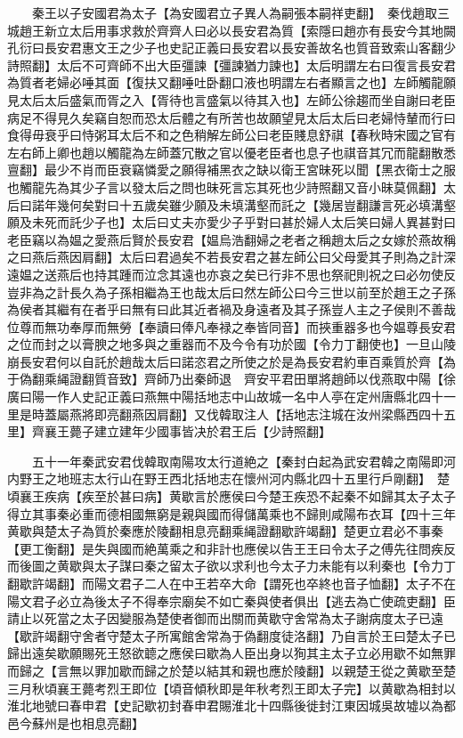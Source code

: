 　　秦王以子安國君為太子【為安國君立子異人為嗣張本嗣祥吏翻】　秦伐趙取三城趙王新立太后用事求救於齊齊人曰必以長安君為質【索隱曰趙亦有長安今其地闕孔衍曰長安君惠文王之少子也史記正義曰長安君以長安善故名也質音致索山客翻少詩照翻】太后不可齊師不出大臣彊諫【彊諫猶力諫也】太后明謂左右曰復言長安君為質者老婦必唾其面【復扶又翻唾吐卧翻口液也明謂左右者顯言之也】左師觸龍願見太后太后盛氣而胥之入【胥待也言盛氣以待其入也】左師公徐趨而坐自謝曰老臣病足不得見久矣竊自恕而恐太后體之有所苦也故願望見太后太后曰老婦恃輦而行曰食得毋衰乎曰恃粥耳太后不和之色稍解左師公曰老臣賤息舒祺【春秋時宋國之官有左右師上卿也趙以觸龍為左師蓋冗散之官以優老臣者也息子也祺音其冗而龍翻散悉亶翻】最少不肖而臣衰竊憐愛之願得補黑衣之缺以衛王宮昧死以聞【黑衣衛士之服也觸龍先為其少子言以發太后之問也昧死言忘其死也少詩照翻又音小昧莫佩翻】太后曰諾年幾何矣對曰十五歲矣雖少願及未填溝壑而託之【幾居豈翻謙言死必填溝壑願及未死而託少子也】太后曰丈夫亦愛少子乎對曰甚於婦人太后笑曰婦人異甚對曰老臣竊以為媪之愛燕后賢於長安君【媪烏浩翻婦之老者之稱趙太后之女嫁於燕故稱之曰燕后燕因肩翻】太后曰君過矣不若長安君之甚左師公曰父母愛其子則為之計深遠媪之送燕后也持其踵而泣念其遠也亦哀之矣已行非不思也祭祀則祝之曰必勿使反豈非為之計長久為子孫相繼為王也哉太后曰然左師公曰今三世以前至於趙王之子孫為侯者其繼有在者乎曰無有曰此其近者禍及身遠者及其子孫豈人主之子侯則不善哉位尊而無功奉厚而無勞【奉讀曰俸凡奉禄之奉皆同音】而挾重器多也今媪尊長安君之位而封之以膏腴之地多與之重器而不及今令有功於國【令力丁翻使也】一旦山陵崩長安君何以自託於趙哉太后曰諾恣君之所使之於是為長安君約車百乘質於齊【為于偽翻乘䋲證翻質音致】齊師乃出秦師退　齊安平君田單將趙師以伐燕取中陽【徐廣曰陽一作人史記正義曰燕無中陽括地志中山故城一名中人亭在定州唐縣北四十一里是時蓋屬燕將即亮翻燕因肩翻】又伐韓取注人【括地志注城在汝州梁縣西四十五里】齊襄王薨子建立建年少國事皆决於君王后【少詩照翻】

　　五十一年秦武安君伐韓取南陽攻太行道絶之【秦封白起為武安君韓之南陽即河内野王之地班志太行山在野王西北括地志在懷州河内縣北四十五里行戶剛翻】　楚頃襄王疾病【疾至於甚曰病】黄歇言於應侯曰今楚王疾恐不起秦不如歸其太子太子得立其事秦必重而德相國無窮是親與國而得儲萬乘也不歸則咸陽布衣耳【四十三年黄歇與楚太子為質於秦應於陵翻相息亮翻乘䋲證翻歇許竭翻】楚更立君必不事秦【更工衡翻】是失與國而絶萬乘之和非計也應侯以告王王曰令太子之傅先往問疾反而後圖之黄歇與太子謀曰秦之留太子欲以求利也今太子力未能有以利秦也【令力丁翻歇許竭翻】而陽文君子二人在中王若卒大命【謂死也卒終也音子恤翻】太子不在陽文君子必立為後太子不得奉宗廟矣不如亡秦與使者俱出【逃去為亡使疏吏翻】臣請止以死當之太子因變服為楚使者御而出關而黄歇守舍常為太子謝病度太子已遠【歇許竭翻守舍者守楚太子所寓館舍常為于偽翻度徒洛翻】乃自言於王曰楚太子已歸出遠矣歇願賜死王怒欲聼之應侯曰歇為人臣出身以狥其主太子立必用歇不如無罪而歸之【言無以罪加歇而歸之於楚以結其和親也應於陵翻】以親楚王從之黄歇至楚三月秋頃襄王薨考烈王即位【頃音傾秋即是年秋考烈王即太子完】以黄歇為相封以淮北地號曰春申君【史記歇初封春申君賜淮北十四縣後徙封江東因城吳故墟以為都邑今蘇州是也相息亮翻】

